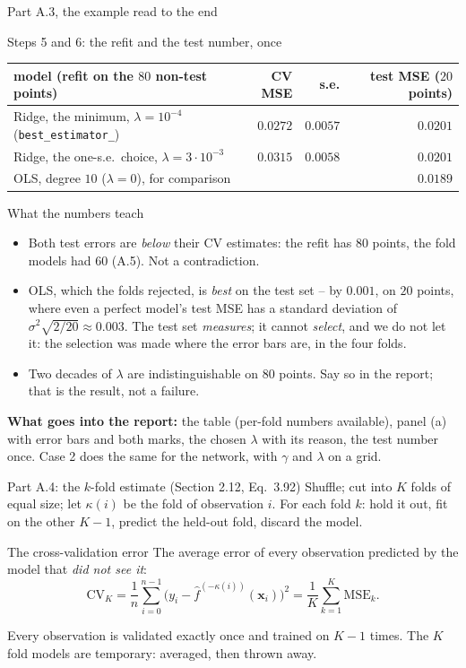\documentclass[10pt,aspectratio=169]{beamer}
\begin{document}
\begin{frame}{Part A.3, the example read to the end}
\footnotesize
\begin{block}{Steps 5 and 6: the refit and the test number, once}
\begin{tabular}{@{}lrrr@{}}
\toprule
model (refit on the $80$ non-test points) & CV MSE & s.e. & test MSE ($20$ points) \\
\midrule
Ridge, the minimum, $\lambda=10^{-4}$ (\texttt{best\_estimator\_}) & $0.0272$ & $0.0057$ & $0.0201$ \\
Ridge, the one-s.e.\ choice, $\lambda=3\cdot10^{-3}$ & $0.0315$ & $0.0058$ & $0.0201$ \\
OLS, degree $10$ ($\lambda=0$), for comparison & & & $0.0189$ \\
\bottomrule
\end{tabular}
\end{block}
\pause
\begin{block}{What the numbers teach}
\begin{itemize}
  \item Both test errors are \emph{below} their CV estimates: the refit has
        $80$ points, the fold models had $60$ (A.5).  Not a contradiction.
  \item OLS, which the folds rejected, is \emph{best} on the test set -- by
        $0.001$, on $20$ points, where even a perfect model's test MSE has a
        standard deviation of $\sigma^2\sqrt{2/20}\approx0.003$.  The test
        set \emph{measures}; it cannot \emph{select}, and we do not let it:
        the selection was made where the error bars are, in the four folds.
  \item Two decades of $\lambda$ are indistinguishable on $80$ points.  Say
        so in the report; that is the result, not a failure.
\end{itemize}
\end{block}
\textbf{What goes into the report:} the table (per-fold numbers
available), panel (a) with error bars and both marks, the chosen $\lambda$
with its reason, the test number once.  Case 2 does the same for the
network, with $\gamma$ and $\lambda$ on a grid.
\end{frame}

\begin{frame}{Part A.4: the $k$-fold estimate (Section 2.12, Eq.~3.92)}
\small
Shuffle; cut into $K$ folds of equal size; let $\kappa(i)$ be the fold of
observation $i$.  For each fold $k$: hold it out, fit on the other $K-1$,
predict the held-out fold, discard the model.
\begin{block}{The cross-validation error}
The average error of every observation predicted by the model that
\emph{did not see it}:
\[
  \mathrm{CV}_K=\frac{1}{n}\sum_{i=0}^{n-1}\bigl(y_i-\hat f^{(-\kappa(i))}(\bm{x}_i)\bigr)^{2}
  =\frac{1}{K}\sum_{k=1}^{K}\mathrm{MSE}_k .
\]
\end{block}
Every observation is validated exactly once and trained on $K-1$ times.
The $K$ fold models are temporary: averaged, then thrown away.
\end{frame}
\end{document}
